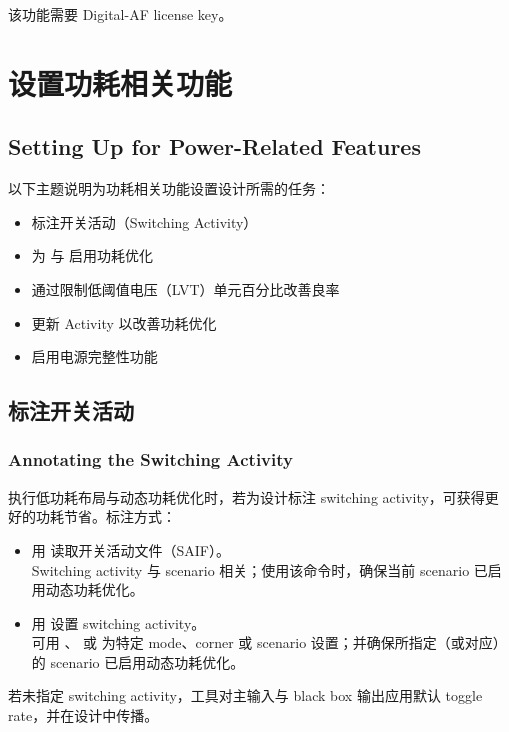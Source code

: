 \begin{noteBox}
该功能需要 Digital-AF license key。
\end{noteBox}

\section{设置功耗相关功能}
\subsection*{Setting Up for Power-Related Features}

以下主题说明为功耗相关功能设置设计所需的任务：
\begin{itemize}
  \item 标注开关活动（Switching Activity）
  \item 为  与  启用功耗优化
  \item 通过限制低阈值电压（LVT）单元百分比改善良率
  \item 更新 Activity 以改善功耗优化
  \item 启用电源完整性功能
\end{itemize}

\subsection{标注开关活动}
\subsubsection*{Annotating the Switching Activity}

执行低功耗布局与动态功耗优化时，若为设计标注 switching activity，可获得更好的功耗节省。标注方式：
\begin{itemize}
  \item 用  读取开关活动文件（SAIF）。\\
        Switching activity 与 scenario 相关；使用该命令时，确保当前 scenario 已启用动态功耗优化。
  \item 用  设置 switching activity。\\
        可用 、 或  为特定 mode、corner 或 scenario 设置；并确保所指定（或对应）的 scenario 已启用动态功耗优化。
\end{itemize}

若未指定 switching activity，工具对主输入与 black box 输出应用默认 toggle rate，并在设计中传播。

